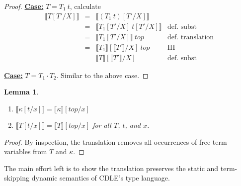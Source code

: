 \documentclass{article}
\newcommand{\interp}[1]{\llbracket #1 \rrbracket}
\newcommand{\startcase}[1]{\vspace{#1} \noindent\textbf{\underline{Case:}}}
\newtheorem{lemma}[theorem]{Lemma}
\begin{document}
\begin{proof}
  \startcase{.2cm} \(T = T_1\ t\), calculate
  \[
    \begin{array}{lclr}
      \interp{T[T'/X]}
      & = 
      & \interp{(T_1\ t)[T'/X]}
      &
      \\
      & =
      & \interp{T_1[T'/X]\ t[T'/X]}
      & \text{def.\ subst}
      \\
      & =
      & \interp{T_1[T'/X]}\ \mathit{top}
      & \text{def.\ translation}
      \\
      & =
      & \interp{T_1}[\interp{T'}/X]\ \mathit{top}
      & \text{IH}
      \\
      & 
      & \interp{T}[\interp{T'}/X]
      & \text{def.\ subst}
    \end{array}
  \]

  \startcase{.2cm} \(T = T_1 \cdot T_2\).
  Similar to the above case.
\end{proof}

\begin{lemma}
  \label{thm:stlc-subst-term}
  \
  \begin{enumerate}
  \item \(\interp{\kappa[t/x]} = \interp{\kappa}[\mathit{top}/x]\)
  \item \(\interp{T[t/x]} = \interp{T}[\mathit{top}/x]\) for all \(T\), \(t\), and \(x\).
  \end{enumerate}
  
\end{lemma}
\begin{proof}
  By inspection, the translation removes all occurrences of free term variables
  from \(T\) and \(\kappa\).
\end{proof}

The main effort left is to show the translation preserves the static and
term-skipping dynamic semantics of CDLE's type language.
\end{document}
